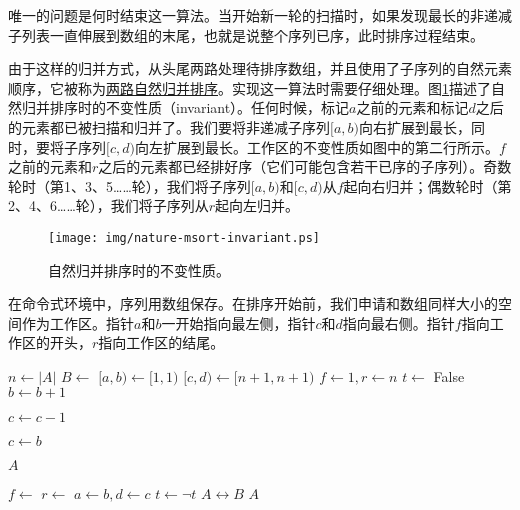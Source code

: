 \documentclass[UTF8]{article}
\begin{document}
唯一的问题是何时结束这一算法。当开始新一轮的扫描时，如果发现最长的非递减子列表一直伸展到数组的末尾，也就是说整个序列已序，此时排序过程结束。

由于这样的归并方式，从头尾两路处理待排序数组，并且使用了子序列的自然元素顺序，它被称为\underline{两路自然归并排序}。实现这一算法时需要仔细处理。图\ref{fig:nature-msort-invariant}描述了自然归并排序时的不变性质（invariant）。任何时候，标记$a$之前的元素和标记$d$之后的元素都已被扫描和归并了。我们要将非递减子序列$[a, b)$向右扩展到最长，同时，要将子序列$[c, d)$向左扩展到最长。工作区的不变性质如图中的第二行所示。$f$之前的元素和$r$之后的元素都已经排好序（它们可能包含若干已序的子序列）。奇数轮时（第1、3、5……轮），我们将子序列$[a, b)$和$[c, d)$从$f$起向右归并；偶数轮时（第2、4、6……轮），我们将子序列从$r$起向左归并。

\begin{figure}[htbp]
 \centering
 \texttt{[image: img/nature-msort-invariant.ps]}
 \caption{自然归并排序时的不变性质。}
 \label{fig:nature-msort-invariant}
\end{figure}

在命令式环境中，序列用数组保存。在排序开始前，我们申请和数组同样大小的空间作为工作区。指针$a$和$b$一开始指向最左侧，指针$c$和$d$指向最右侧。指针$f$指向工作区的开头，$r$指向工作区的结尾。

\begin{algorithmic}[1]
    \State $n \gets |A|$
    \State $B \gets$   
    \Loop
      \State $[a, b) \gets [1, 1)$
      \State $[c, d) \gets [n+1, n+1)$
      \State $f \gets 1, r \gets n$ 
      \State $t \gets $ False 
       
        \Repeat \Comment{扩展$[a, b)$}
          \State $b \gets b + 1$

        \Repeat \Comment{扩展$[c, d)$}
          \State $c \gets c - 1$

         
          \State $c \gets b$
        \EndIf

         \Comment{若$[a, b)$扩展到整个数组则结束}
          \State \Return $A$
        \EndIf

         
          \State $f \gets$ \Call{Merge}{$A, [a, b), [c, d), B, f, 1$}
        \Else {}
          \State $r \gets$ \Call{Merge}{$A, [a, b), [c, d), B, r, -1$}
        \EndIf
        \State $a \gets b, d \gets c$
        \State $t \gets \lnot t$ 
      \EndWhile
      \State {} $A \leftrightarrow B$ 
    \EndLoop
  \EndIf
  \State \Return $A$
\EndFunction
\end{algorithmic}
\end{document}
